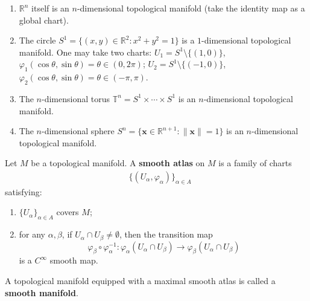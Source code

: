 \begin{example}\label{ex:manifold_examples}
\begin{enumerate}[label=(\roman*)]
    \item $\mathbb{R}^n$ itself is an $n$-dimensional topological manifold (take the identity map as a global chart).
    \item The circle $S^1 = \{(x,y) \in \mathbb{R}^2 : x^2 + y^2 = 1\}$ is a $1$-dimensional topological manifold. One may take two charts: $U_1 = S^1 \setminus \{(1,0)\}$, $\varphi_1(\cos\theta, \sin\theta) = \theta \in (0, 2\pi)$; $U_2 = S^1 \setminus \{(-1,0)\}$, $\varphi_2(\cos\theta, \sin\theta) = \theta \in (-\pi, \pi)$.
    \item The $n$-dimensional torus $\mathbb{T}^n = S^1 \times \cdots \times S^1$ is an $n$-dimensional topological manifold.
    \item The $n$-dimensional sphere $S^n = \{\mathbf{x} \in \mathbb{R}^{n+1} : \|\mathbf{x}\| = 1\}$ is an $n$-dimensional topological manifold.
\end{enumerate}
\end{example}

\begin{definition}\label{def:smooth_manifold}
Let $M$ be a topological manifold. A \textbf{smooth atlas} on $M$ is a family of charts
\[
\begin{aligned}
&\{(U_\alpha, \varphi_\alpha)\}_{\alpha \in A}
\end{aligned}
\]
satisfying:
\begin{enumerate}[label=(\roman*)]
    \item $\{U_\alpha\}_{\alpha \in A}$ covers $M$;
    \item for any $\alpha, \beta$, if $U_\alpha \cap U_\beta \neq \emptyset$, then the transition map
    \[
    \varphi_\beta \circ \varphi_\alpha^{-1}: \varphi_\alpha(U_\alpha \cap U_\beta) \to \varphi_\beta(U_\alpha \cap U_\beta)
    \]
    is a $C^\infty$ smooth map.
\end{enumerate}
A topological manifold equipped with a maximal smooth atlas is called a \textbf{smooth manifold}.
\end{definition}

